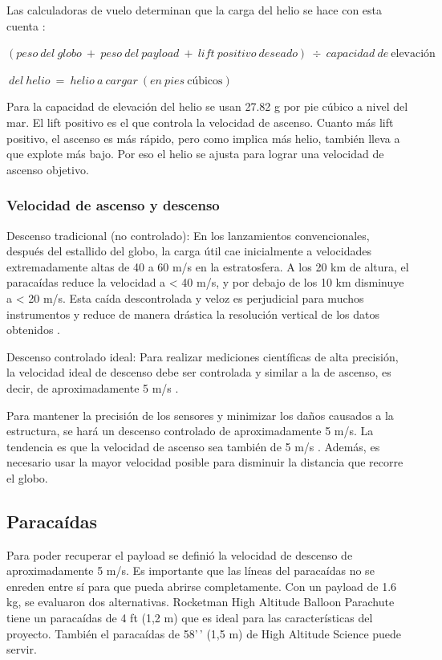 \documentclass[12pt,a4paper]{article}
\begin{document}
Las calculadoras de vuelo determinan que la carga del helio se hace con esta cuenta \cite{ref74}:

\((peso\ del\ globo\  + \ peso\ del\ payload\  + \ lift\ positivo\ deseado)\  \div \ capacidad\ de\ \text{elevación}\)

\(\ del\ helio\  = \ helio\ a\ cargar\ (en\ pies\ \text{cúbicos})\ \)

Para la capacidad de elevación del helio se usan 27.82 g por pie cúbico a nivel del mar. El lift positivo es el que controla la velocidad de ascenso. Cuanto más lift positivo, el ascenso es más rápido, pero como implica más helio, también lleva a que explote más bajo. Por eso el helio se ajusta para lograr una velocidad de ascenso objetivo.

\subsubsection{Velocidad de ascenso y descenso}\label{velocidad-de-ascenso-y-descenso}

Descenso tradicional (no controlado): En los lanzamientos convencionales, después del estallido del globo, la carga útil cae inicialmente a velocidades extremadamente altas de 40 a 60 m/s en la estratosfera. A los 20 km de altura, el paracaídas reduce la velocidad a \textless{} 40 m/s, y por debajo de los 10 km disminuye a \textless{} 20 m/s. Esta caída descontrolada y veloz es perjudicial para muchos instrumentos y reduce de manera drástica la resolución vertical de los datos obtenidos \cite{ref72}.

Descenso controlado ideal: Para realizar mediciones científicas de alta precisión, la velocidad ideal de descenso debe ser controlada y similar a la de ascenso, es decir, de aproximadamente 5 m/s \cite{ref72}.

Para mantener la precisión de los sensores y minimizar los daños causados a la estructura, se hará un descenso controlado de aproximadamente 5 m/s. La tendencia es que la velocidad de ascenso sea también de 5 m/s \cite{ref72}. Además, es necesario usar la mayor velocidad posible para disminuir la distancia que recorre el globo.

\subsection{Paracaídas}\label{paracaidas}

Para poder recuperar el payload se definió la velocidad de descenso de aproximadamente 5 m/s. Es importante que las líneas del paracaídas no se enreden entre sí para que pueda abrirse completamente. Con un payload de 1.6 kg, se evaluaron dos alternativas. Rocketman High Altitude Balloon Parachute tiene un paracaídas de 4 ft (1,2 m) que es ideal para las características del proyecto. También el paracaídas de 58'\,' (1,5 m) de High Altitude Science puede servir.
\end{document}
